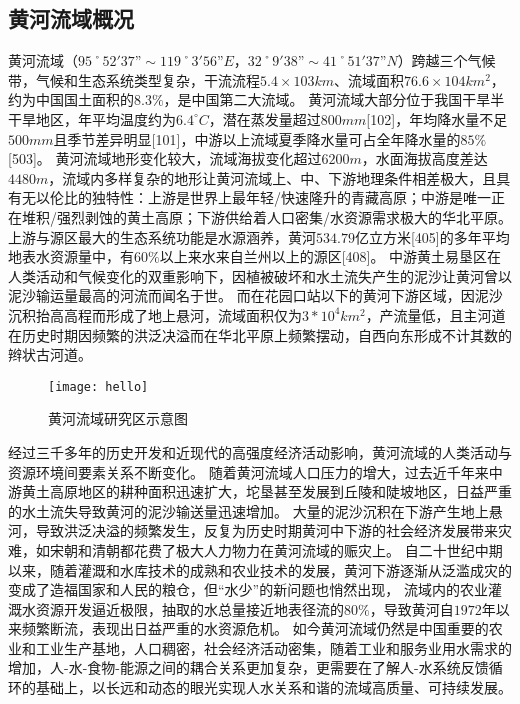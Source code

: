 \subsection{黄河流域概况}

黄河流域（$95˚52'37” \sim 119˚3'56”E$，$32˚9'38” \sim 41˚51'37”N$）跨越三个气候带，气候和生态系统类型复杂，干流流程$5.4 \times 103km$、流域面积$76.6 \times 104km^2$，约为中国国土面积的$8.3\%$，是中国第二大流域。
黄河流域大部分位于我国干旱半干旱地区，年平均温度约为$6.4^{\circ}C$，潜在蒸发量超过$800mm$[102]，年均降水量不足$500mm$且季节差异明显[101]，中游以上流域夏季降水量可占全年降水量的$85\%$[503]。
黄河流域地形变化较大，流域海拔变化超过$6200m$，水面海拔高度差达$4480m$，流域内多样复杂的地形让黄河流域上、中、下游地理条件相差极大，且具有无以伦比的独特性：上游是世界上最年轻/快速隆升的青藏高原；中游是唯一正在堆积/强烈剥蚀的黄土高原；下游供给着人口密集/水资源需求极大的华北平原。
上游与源区最大的生态系统功能是水源涵养，黄河$534.79$亿立方米[405]的多年平均地表水资源量中，有$60\%$以上来水来自兰州以上的源区[408]。
中游黄土易垦区在人类活动和气候变化的双重影响下，因植被破坏和水土流失产生的泥沙让黄河曾以泥沙输运量最高的河流而闻名于世\cite{best2019}。
而在花园口站以下的黄河下游区域，因泥沙沉积抬高高程而形成了地上悬河，流域面积仅为$3*10^4 km^2$，产流量低，且主河道在历史时期因频繁的洪泛决溢而在华北平原上频繁摆动，自西向东形成不计其数的辫状古河道。

\begin{figure}[htb] %
    \texttt{[image: hello]}
    \caption{黄河流域研究区示意图}\label{ch1:fig:study_area}
\end{figure}

经过三千多年的历史开发和近现代的高强度经济活动影响，黄河流域的人类活动与资源环境间要素关系不断变化\cite{fu2021a}。
随着黄河流域人口压力的增大，过去近千年来中游黄土高原地区的耕种面积迅速扩大，坨垦甚至发展到丘陵和陡坡地区，日益严重的水土流失导致黄河的泥沙输送量迅速增加\cite{wu2020a}。
大量的泥沙沉积在下游产生地上悬河，导致洪泛决溢的频繁发生，反复为历史时期黄河中下游的社会经济发展带来灾难，如宋朝和清朝都花费了极大人力物力在黄河流域的赈灾上。
自二十世纪中期以来，随着灌溉和水库技术的成熟和农业技术的发展，黄河下游逐渐从泛滥成灾的变成了造福国家和人民的粮仓，但“水少”的新问题也悄然出现，
流域内的农业灌溉水资源开发逼近极限，抽取的水总量接近地表径流的$80\%$，导致黄河自$1972$年以来频繁断流，表现出日益严重的水资源危机。
如今黄河流域仍然是中国重要的农业和工业生产基地，人口稠密，社会经济活动密集，随着工业和服务业用水需求的增加，人-水-食物-能源之间的耦合关系更加复杂，更需要在了解人-水系统反馈循环的基础上，以长远和动态的眼光实现人水关系和谐的流域高质量、可持续发展。

